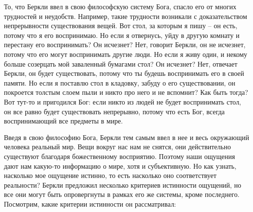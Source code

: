 \documentclass[a4paper, 14pt]{extreport}
\begin{document}
То, что Беркли ввел в свою философскую систему Бога, спасло его от
многих трудностей и неудобств. Например, такие трудности возникали с
доказательством непрерывности существования вещей. Вот стол, за которым
я пишу -- он есть, потому что я его воспринимаю. Но если я отвернусь,
уйду в другую комнату и перестану его воспринимать? Он исчезнет? Нет,
говорит Беркли, он не исчезнет, потому что его могут воспринимать другие
люди. Но если я живу один, и некому больше созерцать мой заваленный
бумагами стол? Он исчезнет? Нет, отвечает Беркли, он будет существовать,
потому что ты будешь воспринимать его в своей памяти. Но если я поставлю
стол в кладовку, забуду о его существовании, он покроется толстым слоем
пыли и никто про него и не вспомнит? Как быть тогда? Вот тут-то и
пригодился Бог: если никто из людей не будет воспринимать стол, он все
равно будет существовать непрерывно, потому что есть Бог, всегда
воспринимающий все предметы в мире.

Введя в свою философию Бога, Беркли тем самым ввел в нее и весь
окружающий человека реальный мир. Вещи вокруг нас нам не снятся, они
действительно существуют благодаря божественному восприятию. Поэтому
наши ощущения дают нам какую-то информацию о мире, хотя и субъективную.
Но как узнать, насколько мое ощущение истинно, то есть насколько оно
соответствует реальности? Беркли предложил несколько критериев
истинности ощущений, но все они могут быть опровергнуты в рамках его же
системы, кроме последнего. Посмотрим, какие критерии истинности он
рассматривал:
\end{document}
